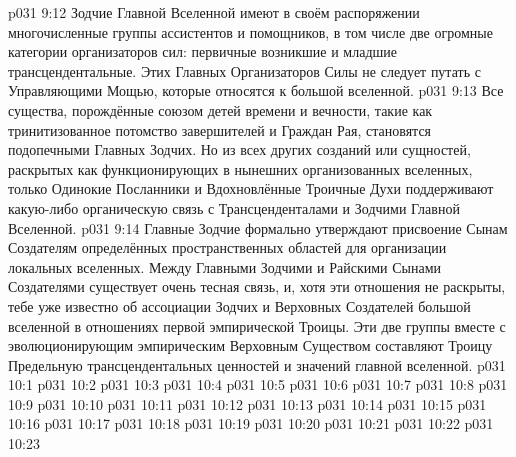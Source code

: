 \vs p031 9:12 Зодчие Главной Вселенной имеют в своём распоряжении многочисленные группы ассистентов и помощников, в том числе две огромные категории организаторов сил: первичные возникшие и младшие трансцендентальные. Этих Главных Организаторов Силы не следует путать с Управляющими Мощью, которые относятся к большой вселенной.
\vs p031 9:13 Все существа, порождённые союзом детей времени и вечности, такие как тринитизованное потомство завершителей и Граждан Рая, становятся подопечными Главных Зодчих. Но из всех других созданий или сущностей, раскрытых как функционирующих в нынешних организованных вселенных, только Одинокие Посланники и Вдохновлённые Троичные Духи поддерживают какую\hyp{}либо органическую связь с Трансценденталами и Зодчими Главной Вселенной.
\vs p031 9:14 Главные Зодчие формально утверждают присвоение Сынам Создателям определённых пространственных областей для организации локальных вселенных. Между Главными Зодчими и Райскими Сынами Создателями существует очень тесная связь, и, хотя эти отношения не раскрыты, тебе уже известно об ассоциации Зодчих и Верховных Создателей большой вселенной в отношениях первой эмпирической Троицы. Эти две группы вместе с эволюционирующим эмпирическим Верховным Существом составляют Троицу Предельную трансцендентальных ценностей и значений главной вселенной.
\vs p031 10:1 
\vs p031 10:2 
\vs p031 10:3 
\vs p031 10:4 
\vs p031 10:5 
\vs p031 10:6 
\vs p031 10:7 
\vs p031 10:8 
\vs p031 10:9 
\vs p031 10:10 
\vs p031 10:11 
\vs p031 10:12 
\vs p031 10:13 
\vs p031 10:14 
\vs p031 10:15 
\vs p031 10:16 
\vs p031 10:17 
\vs p031 10:18 
\vs p031 10:19 \pc 
\vs p031 10:20 \pc 
\vsetoff
\vs p031 10:21 
\vs p031 10:22 
\vs p031 10:23 
\quizlink
